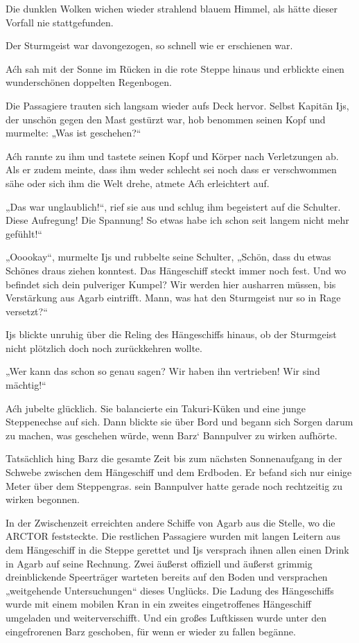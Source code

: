 Die dunklen Wolken wichen wieder strahlend blauem Himmel, als hätte dieser Vorfall nie stattgefunden.

Der Sturmgeist war davongezogen, so schnell wie er erschienen war.

Aćh sah mit der Sonne im Rücken in die rote Steppe hinaus und erblickte einen wunderschönen doppelten Regenbogen.

Die Passagiere trauten sich langsam wieder aufs Deck hervor. Selbst Kapitän Ijs, der unschön gegen den Mast gestürzt war, hob benommen seinen Kopf und murmelte: „Was ist geschehen?“

Aćh rannte zu ihm und tastete seinen Kopf und Körper nach Verletzungen ab. Als er zudem meinte, dass ihm weder schlecht sei noch dass er verschwommen sähe oder sich ihm die Welt drehe, atmete Aćh erleichtert auf.

„Das war unglaublich!“, rief sie aus und schlug ihm begeistert auf die Schulter. Diese Aufregung! Die Spannung! So etwas habe ich schon seit langem nicht mehr gefühlt!“

„Ooookay“, murmelte Ijs und rubbelte seine Schulter, „Schön, dass du etwas Schönes draus ziehen konntest. Das Hängeschiff steckt immer noch fest. Und wo befindet sich dein pulveriger Kumpel? Wir werden hier ausharren müssen, bis Verstärkung aus Agarb eintrifft. Mann, was hat den Sturmgeist nur so in Rage versetzt?“

Ijs blickte unruhig über die Reling des Hängeschiffs hinaus, ob der Sturmgeist nicht plötzlich doch noch zurückkehren wollte.

„Wer kann das schon so genau sagen? Wir haben ihn vertrieben! Wir sind mächtig!“

Aćh jubelte glücklich. Sie balancierte ein Takuri-Küken und eine junge Steppenechse auf sich. Dann blickte sie über Bord und begann sich Sorgen darum zu machen, was geschehen würde, wenn Barz‘ Bannpulver zu wirken aufhörte.



\trennzeichen



Tatsächlich hing Barz die gesamte Zeit bis zum nächsten Sonnenaufgang in der Schwebe zwischen dem Hängeschiff und dem Erdboden. Er befand sich nur einige Meter über dem Steppengras. sein Bannpulver hatte gerade noch rechtzeitig zu wirken begonnen.

In der Zwischenzeit erreichten andere Schiffe von Agarb aus die Stelle, wo die ARCTOR feststeckte. Die restlichen Passagiere wurden mit langen Leitern aus dem Hängeschiff in die Steppe gerettet und Ijs versprach ihnen allen einen Drink in Agarb auf seine Rechnung. Zwei äußerst offiziell und äußerst grimmig dreinblickende Speerträger warteten bereits auf den Boden und versprachen „weitgehende Untersuchungen“ dieses Unglücks. Die Ladung des Hängeschiffs wurde mit einem mobilen Kran in ein zweites eingetroffenes Hängeschiff umgeladen und weiterverschifft. Und ein großes Luftkissen wurde unter den eingefrorenen Barz geschoben, für wenn er wieder zu fallen begänne.

